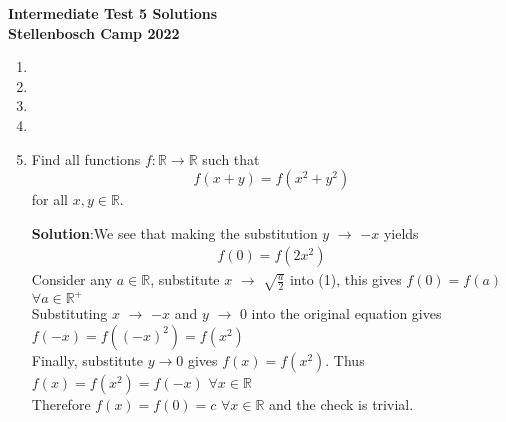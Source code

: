 \documentclass{article}
\begin{document}
\thispagestyle{empty}

\begin{center} \bfseries
  \Large Intermediate Test 5 Solutions
  \\ \vspace{12pt}
  \large Stellenbosch Camp 2022
\end{center}

\bigskip \bigskip

\begin{enumerate}[itemsep=24pt]

\item


\item


\item 



\item 


\item
Find all functions $f : \mathbb{R} \to \mathbb{R}$ such that \[ f(x+y) = f(x^2+y^2) \] for all $x,y \in \mathbb{R}$.

\textbf{Solution}:We see that making the substitution $y$ $\rightarrow$ $-x$ yields 
\begin{align}
    f(0)=f(2x^{2})
\end{align}
Consider any $a \in \mathbb{R}$, substitute $x$ $\rightarrow$ $\sqrt{\frac{a}{2}}$ into (1), this gives $f(0) = f(a)$ $\forall a \in \mathbb{R^{+}}$
\\Substituting $x$ $\rightarrow$ $-x$ and $y$ $\rightarrow$ $0$ into the original equation gives $f(-x) = f((-x)^{2}) = f(x^{2})$
\\Finally, substitute $y \rightarrow 0$ gives $f(x) = f(x^{2})$. Thus $f(x)= f(x^{2}) = f(-x)$ $\forall x \in \mathbb{R}$
\\Therefore $f(x) = f(0) = c$ $\forall x \in \mathbb{R}$ and the check is trivial.

\end{enumerate}
\end{document}
